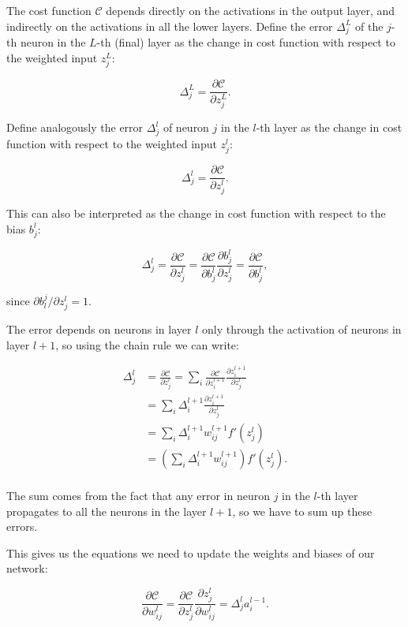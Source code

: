 The cost function $\mathcal{C}$ depends directly on the activations in the output layer, and indirectly on the activations
in all the lower layers.
Define the error $\Delta_j^L$ of the $j$-th neuron in the $L$-th (final) layer as the change in cost function
with respect to the weighted input $z_j^L$:

$$ \Delta_j^L = \frac{\partial \mathcal{C}}{\partial z_j^L} .$$

Define analogously the error $\Delta_j^l$ of neuron $j$ in the $l$-th layer as the change in cost function with respect to the weighted input
$z_j^l$:

$$ \Delta_j^l = \frac{\partial \mathcal{C}}{\partial z_j^l} .$$

This can also be interpreted as the change in cost function with respect to the bias $b_j^l$:

$$ \Delta_j^l = \frac{\partial \mathcal{C}}{\partial z_j^l} = \frac{\partial \mathcal{C}}{\partial b_j^l} 
\frac{\partial b_j^l}{\partial z_j^l} = \frac{\partial \mathcal{C}}{\partial b_j^l} ,$$

since $ \partial b_l^j / \partial z_j^l = 1$.

The error depends on neurons in layer $l$ only through the activation of neurons in layer $l + 1$, so using the chain rule we can write:

\begin{equation}
\begin{split}
\Delta_j^l &= \frac{\partial \mathcal{C}}{\partial z_j^l} = \sum_i \frac{\partial \mathcal{C}}{\partial z_i^{l+1}}
\frac{\partial z_i^{l+1}}{\partial z_j^l} \\
           &= \sum_i \Delta_i^{l+1} \frac{\partial z_i^{l+1}}{\partial z_j^l} \\
           &= \sum_i \Delta_i^{l+1} w_{ij}^{l+1} f'(z_j^l) \\
           &= \left( \sum_i \Delta_i^{l+1} w_{ij}^{l+1} \right) f'(z_j^l) .\\
\end{split}
\end{equation}

The sum comes from the fact that any error in neuron $j$ in the $l$-th layer propagates to all the neurons
in the layer $l + 1$,
so we have to sum up these errors.

This gives us the equations we need to update the weights and biases of our network:

$$ \frac{\partial \mathcal{C}}{\partial w_{ij}^l} = \frac{\partial \mathcal{C}}{\partial z_j^l} \frac{\partial z_j^l}{\partial w_{ij}^l}
= \Delta_j^l a_i^{l-1} .$$

